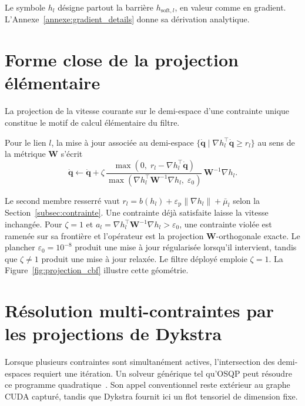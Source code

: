 \label{annexe:cbf_details}

Le symbole $h_l$ désigne partout la barrière $h_{\mathrm{soft},l}$, en valeur comme en gradient. L'Annexe~\ref{annexe:gradient_details} donne sa dérivation analytique.

\section*{Forme close de la projection élémentaire}

La projection de la vitesse courante sur le demi-espace d'une contrainte unique constitue le motif de calcul élémentaire du filtre.

Pour le lien $l$, la mise à jour associée au demi-espace $\{\dot{\mathbf{q}} \mid \nabla h_l^\top\dot{\mathbf{q}} \geq r_l\}$ au sens de la métrique $\mathbf{W}$ s'écrit
\begin{equation}\label{eq:proj_elem}
\dot{\mathbf{q}}
\leftarrow
\dot{\mathbf{q}}
+
\zeta\,
\frac{
\max\!\left(0,\; r_l-\nabla h_l^\top\dot{\mathbf{q}}\right)
}{
\max\!\left(\nabla h_l^\top\mathbf{W}^{-1}\nabla h_l,\;\varepsilon_0\right)
}
\,\mathbf{W}^{-1}\nabla h_l.
\end{equation}

Le second membre resserré vaut $r_l=b(h_l)+\varepsilon_{\mathrm{p}}\|\nabla h_l\|+\bar\mu_l$ selon la Section~\ref{subsec:contrainte}. Une contrainte déjà satisfaite laisse la vitesse inchangée. Pour $\zeta=1$ et $a_l=\nabla h_l^\top\mathbf{W}^{-1}\nabla h_l>\varepsilon_0$, une contrainte violée est ramenée sur sa frontière et l'opérateur est la projection $\mathbf{W}$-orthogonale exacte. Le plancher $\varepsilon_0=10^{-8}$ produit une mise à jour régularisée lorsqu'il intervient, tandis que $\zeta\ne1$ produit une mise à jour relaxée. Le filtre déployé emploie $\zeta=1$. La Figure~\ref{fig:projection_cbf} illustre cette géométrie.

\section*{Résolution multi-contraintes par les projections de Dykstra}

Lorsque plusieurs contraintes sont simultanément actives, l'intersection des demi-espaces requiert une itération. Un solveur générique tel qu'OSQP peut résoudre ce programme quadratique~\cite{Stellato2020Osqp}. Son appel conventionnel reste extérieur au graphe \ac{CUDA} capturé, tandis que Dykstra fournit ici un flot tensoriel de dimension fixe.

